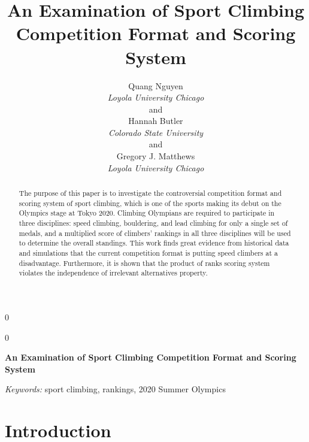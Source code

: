 \documentclass[12pt]{article}
\newcommand{\blind}{0}
\begin{document}
\def\spacingset#1{\renewcommand{\baselinestretch}%
{#1}\small\normalsize} \spacingset{1}



\blind
{
  \title{\bf An Examination of Sport Climbing Competition Format and
Scoring System}

  \author{
        Quang Nguyen \\
    \textit{Loyola University Chicago}\\
     and \\     Hannah Butler \\
    \textit{Colorado State University}\\
     and \\     Gregory J. Matthews \\
    \textit{Loyola University Chicago}\\
      }
  \maketitle
} \fi

\blind
{
  \bigskip
  \bigskip
  \bigskip
  \begin{center}
    {\LARGE\bf An Examination of Sport Climbing Competition Format and
Scoring System}
  \end{center}
  \medskip
} \fi

\bigskip
\begin{abstract}
The purpose of this paper is to investigate the controversial
competition format and scoring system of sport climbing, which is one of
the sports making its debut on the Olympics stage at Tokyo 2020.
Climbing Olympians are required to participate in three disciplines:
speed climbing, bouldering, and lead climbing for only a single set of
medals, and a multiplied score of climbers' rankings in all three
disciplines will be used to determine the overall standings. This work
finds great evidence from historical data and simulations that the
current competition format is putting speed climbers at a disadvantage.
Furthermore, it is shown that the product of ranks scoring system
violates the independence of irrelevant alternatives property.
\end{abstract}

\noindent%
{\it Keywords:} sport climbing, rankings, 2020 Summer Olympics
\vfill

\newpage
\spacingset{1.45} %

\hypertarget{introduction}{%
\section{Introduction}\label{introduction}}
\end{document}
